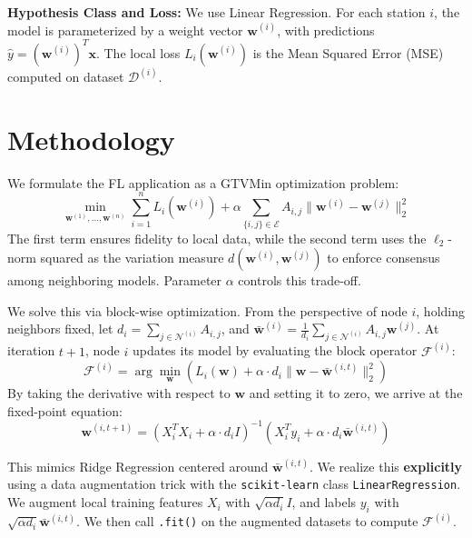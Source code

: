 \documentclass{article}
\begin{document}
\textbf{Hypothesis Class and Loss:} We use Linear Regression. For each station $i$, the model is parameterized by a weight vector $\mathbf{w}^{(i)}$, with predictions $\hat{y} = (\mathbf{w}^{(i)})^T \mathbf{x}$. The local loss $L_i(\mathbf{w}^{(i)})$ is the Mean Squared Error (MSE) computed on dataset $\mathcal{D}^{(i)}$.

\section{Methodology}
\label{sec:meth}

We formulate the FL application as a GTVMin optimization problem:
\begin{equation}
\min_{\mathbf{w}^{(1)},\ldots,\mathbf{w}^{(n)}} \sum_{i=1}^{n} L_i(\mathbf{w}^{(i)}) + \alpha \sum_{\{i,j\} \in \mathcal{E}} A_{i,j} \|\mathbf{w}^{(i)} - \mathbf{w}^{(j)}\|_2^2
\label{eq:gtvmin}
\end{equation}
The first term ensures fidelity to local data, while the second term uses the $\ell_2$-norm squared as the variation measure $d(\mathbf{w}^{(i)}, \mathbf{w}^{(j)})$ to enforce consensus among neighboring models. Parameter $\alpha$ controls this trade-off.

We solve this via block-wise optimization. From the perspective of node $i$, holding neighbors fixed, let $d_i = \sum_{j \in \mathcal{N}^{(i)}} A_{i,j}$, and $\mathbf{\bar{w}}^{(i)} = \frac{1}{d_i} \sum_{j \in \mathcal{N}^{(i)}} A_{i,j} \mathbf{w}^{(j)}$.
At iteration $t+1$, node $i$ updates its model by evaluating the block operator $\mathcal{F}^{(i)}$:
\begin{equation}
\mathcal{F}^{(i)} = \arg\min_{\mathbf{w}} \left( L_i(\mathbf{w}) + \alpha \cdot d_i \|\mathbf{w} - \mathbf{\bar{w}}^{(i, t)}\|_2^2 \right)
\label{eq:blockop}
\end{equation}
By taking the derivative with respect to $\mathbf{w}$ and setting it to zero, we arrive at the fixed-point equation:
\begin{equation}
\mathbf{w}^{(i, t+1)} = \left( X_i^T X_i + \alpha \cdot d_i I \right)^{-1} \left( X_i^T y_i + \alpha \cdot d_i \mathbf{\bar{w}}^{(i, t)} \right)
\end{equation}

This mimics Ridge Regression centered around $\mathbf{\bar{w}}^{(i, t)}$. We realize this \textbf{explicitly} using a data augmentation trick with the \texttt{scikit-learn} \cite{pedregosa2011scikit} class \texttt{LinearRegression}. We augment local training features $X_i$ with $\sqrt{\alpha d_i} I$, and labels $y_i$ with $\sqrt{\alpha d_i} \mathbf{\bar{w}}^{(i,t)}$. We then call \texttt{.fit()} on the augmented datasets to compute $\mathcal{F}^{(i)}$.
\end{document}
